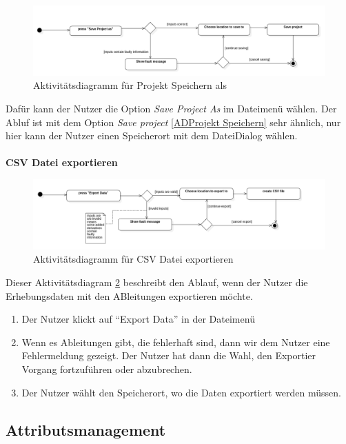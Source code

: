 \documentclass{article}
\begin{document}
\begin{figure}[H]%
    \centering
    \includegraphics[width=13cm]{entwurf/Entwurf_dokument/img/Alissa/SaveProjectAsAD.png}
    \caption{Aktivitätsdiagramm für Projekt Speichern als}
    \label{ADProkjektSpeichernAls}
\end{figure}
Dafür kann der Nutzer die Option \textit{Save Project As} im Dateimenü wählen. Der Abluf ist mit dem Option \textit{Save project} \ref{ADProjekt Speichern} sehr ähnlich, nur hier kann der Nutzer einen Speicherort mit dem Datei\textendash Dialog wählen.
\\\\
\textbf{\large{CSV Datei exportieren}}
\begin{figure}[H]%
    \centering
    \includegraphics[width=13cm]{entwurf/Entwurf_dokument/img/Alissa/ExportCSVAD.png}
    \caption{Aktivitätsdiagramm für CSV Datei exportieren}
    \label{ad:adExportData}
\end{figure}
Dieser Aktivitätsdiagram \ref{ad:adExportData} beschreibt den Ablauf, wenn der Nutzer die Erhebungsdaten mit den ABleitungen exportieren möchte.
\begin{enumerate}
    \item[1.] Der Nutzer klickt auf \enquote{Export Data} in der Dateimenü
    \item[2.] Wenn es Ableitungen gibt, die fehlerhaft sind, dann wir dem Nutzer eine Fehlermeldung gezeigt. Der Nutzer hat dann die Wahl, den Exportier Vorgang fortzuführen oder abzubrechen.
    \item[3.] Der Nutzer wählt den Speicherort, wo die Daten exportiert werden müssen.
\end{enumerate}

\newpage
\subsection{Attributsmanagement} \label{sec:Attributsmanagement}
\end{document}
